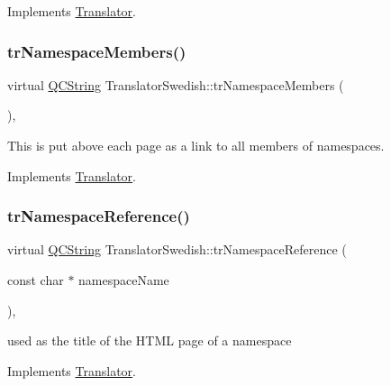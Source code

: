 Implements \mbox{\hyperlink{class_translator}{Translator}}.

\mbox{\label{class_translator_swedish_aa14b7b46f93cb62360a54f898f1cb0ed}} 
\subsubsection{\texorpdfstring{trNamespaceMembers()}{trNamespaceMembers()}}
{\footnotesize\ttfamily virtual \mbox{\hyperlink{class_q_c_string}{Q\+C\+String}} Translator\+Swedish\+::tr\+Namespace\+Members (\begin{DoxyParamCaption}{ }\end{DoxyParamCaption})\hspace{0.3cm}{\ttfamily [inline]}, {\ttfamily [virtual]}}

This is put above each page as a link to all members of namespaces. 

Implements \mbox{\hyperlink{class_translator}{Translator}}.

\mbox{\label{class_translator_swedish_a4824bb4f7063f391d27245f1c1efc1be}} 
\subsubsection{\texorpdfstring{trNamespaceReference()}{trNamespaceReference()}}
{\footnotesize\ttfamily virtual \mbox{\hyperlink{class_q_c_string}{Q\+C\+String}} Translator\+Swedish\+::tr\+Namespace\+Reference (\begin{DoxyParamCaption}\item[{const char $\ast$}]{namespace\+Name }\end{DoxyParamCaption})\hspace{0.3cm}{\ttfamily [inline]}, {\ttfamily [virtual]}}

used as the title of the H\+T\+ML page of a namespace 

Implements \mbox{\hyperlink{class_translator}{Translator}}.

\mbox{\label{class_translator_swedish_a600fa77944c219cefd22862bb7ba9fec}} 
